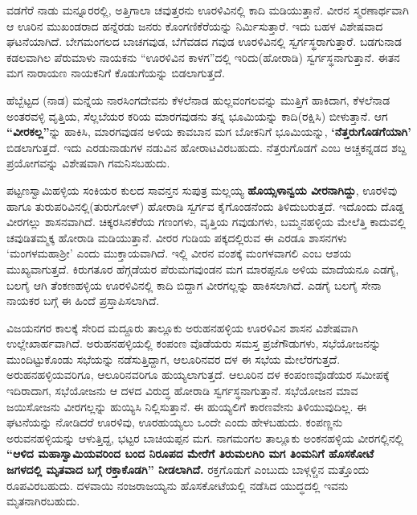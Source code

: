 ವಡಗೆರೆ ನಾಡು ಮನ್ನೂರರಲ್ಲಿ, ಅತ್ತಿಗಾಲಾ ಚವುತ್ತರನು ಊರಳಿವಿನಲ್ಲಿ ಕಾದಿ ಮಡಿಯುತ್ತಾನೆ. ವೀರನ ಸ್ಮರಣಾರ್ಥವಾಗಿ ಆ ಊರಿನ ಮುಖಂಡರಾದ ಹನ್ನೆರಡು ಜನರು ಕೊಂಗಣಿಕೆರೆಯನ್ನು ನಿರ್ಮಿಸುತ್ತಾರೆ. ಇದು ಬಹಳ ವಿಶೇಷವಾದ ಘಟನೆಯಾಗಿದೆ. ಬೇಗಮಂಗಲದ ಬಾಚಗವುಡ, ಬೆಗೆವಡದ ಗವುಡ ಊರಳಿವಿನಲ್ಲಿ ಸ್ವರ್ಗಸ್ಥರಾಗುತ್ತಾರೆ. ಬಡಗುನಾಡ ಕಡಲವಾಗಿಲ ಪೆರುಮಾಳು ನಾಯಕನು “ಊರಳಿವಿನ ಕಾಳಗ”ದಲ್ಲಿ ಇರಿದು(ಹೋರಾಡಿ) ಸ್ವರ್ಗಸ್ಥನಾಗುತ್ತಾನೆ. ಈತನ ಮಗ ನಾರಾಯಣ ನಾಯಕನಿಗೆ ಕೊಡುಗೆಯನ್ನು ಬಿಡಲಾಗುತ್ತದೆ.

ಹೆಬ್ಬೆಟ್ಟದ (ನಾಡ) ಮನ್ನೆಯ ನಾರಸಿಂಗದೇವನು ಕೆಳಲೆನಾಡ ಹುಲ್ಲವಂಗಲವನ್ನು ಮುತ್ತಿಗೆ ಹಾಕಿದಾಗ, ಕೆಳಲೆನಾಡ ಅಂತರವಳ್ಳಿ ವೃತ್ತಿಯ, ಸೆಲ್ಲಬೆಯರ ಕರಿಯ ಮಾರಗವುಡನು ತನ್ನ ಭೂಮಿಯನ್ನು ಕಾದಿ(ರಕ್ಷಿಸಿ) ಬೀಳುತ್ತಾನೆ. ಆಗ \textbf{“ವೀರಕಲ್ಲ”}ನ್ನು ಹಾಕಿಸಿ, ಮಾರಗವುಡನ ಅಳಿಯ ಕಾವಬಾನ ಮಗ ಬೋಕನಿಗೆ ಭೂಮಿಯನ್ನು, \textbf{‘ನೆತ್ತರುಗೊಡಗೆಯಾಗಿ’} ಬಿಡಲಾಗುತ್ತದೆ. ಇದು ಎರಡುನಾಡುಗಳ ನಡುವಿನ ಹೋರಾಟವಿರಬಹುದು. ನೆತ್ತರುಗೊಡಗೆ ಎಂಬ ಅಚ್ಚಕನ್ನಡದ ಶಬ್ದ ಪ್ರಯೋಗವನ್ನು ವಿಶೇಷವಾಗಿ ಗಮನಿಸಬಹುದು.

\newpage

ಪಟ್ಟಣಸ್ವಾಮಿಹಳ್ಳಿಯ ಸಂಕಿಯರ ಕುಲದ ಸಾವನ್ತನ ಸುಪುತ್ರ ಮಲ್ಲಯ್ಯ \textbf{ಹೊಯ್ಸಳಾನ್ವಯ ವೀರನಾಗಿದ್ದು}, ಊರಳಿವು ಹಾಗೂ ತುರುಪರಿವಿನಲ್ಲಿ(ತುರುಗೋಳ್​) ಹೋರಾಡಿ ಸ್ವರ್ಗವ ಕೈಗೊಂಡನೆಂದು ತಿಳಿದುಬರುತ್ತದೆ. ಇದೊಂದು ದೊಡ್ಡ ವೀರಗಲ್ಲು ಶಾಸನವಾಗಿದೆ. ಚಿಕ್ಕರಸಿನಕೆರೆಯ ಗಣಂಗಳು, ವೃತ್ತಿಯ ಗವುಡುಗಳು, ಬಮ್ಮನಹಳ್ಳಿಯ ಮೇಲೆತ್ತಿ ಕಾದುವಲ್ಲಿ ಚವುಡಿತಮ್ಮಕ್ಕ ಹೋರಾಡಿ ಮಡಿಯುತ್ತಾನೆ. ವೀರರ ಗುಡಿಯ ಪಕ್ಕದಲ್ಲಿರುವ ಈ ಎರಡೂ ಶಾಸನಗಳು ‘ಮಂಗಳಮಹಾಶ‍್ರೀ’ ಎಂದು ಮುಕ್ತಾಯವಾಗಿದೆ. ಇಲ್ಲಿ ವೀರನ ವಂಶಕ್ಕೆ ಮಂಗಳವಾಗಲಿ ಎಂಬ ಆಶಯ ಮುಖ್ಯವಾಗುತ್ತದೆ. ಕಿರುಗತೂರ ಹೆಗ್ಗಡೆಯರ ಪೆರುಮಗವುಂಡನ ಮಗ ಮಾರಪ್ಪನೂ ಅಳಿಯ ಮಾದೆಯನೂ ಎಡಗೈ, ಬಲಗೈ ಆಗಿ ತೆಂಕಣಹಳ್ಳಿಯ ಊರಳಿವಿನಲ್ಲಿ ಕಾದಿ ಬಿದ್ದಾಗ ವೀರಗಲ್ಲನ್ನು ಹಾಕಿಸಲಾಗಿದೆ. ಎಡಗೈ ಬಲಗೈ ಸೇನಾ ನಾಯಕರ ಬಗ್ಗೆ ಈ ಹಿಂದೆ ಪ್ರಸ್ತಾಪಿಸಲಾಗಿದೆ.

\vskip -2pt

ವಿಜಯನಗರ ಕಾಲಕ್ಕೆ ಸೇರಿದ ಮದ್ದೂರು ತಾಲ್ಲೂಕು ಅರುಹನಹಳ್ಳಿಯ ಊರಳಿವಿನ ಶಾಸನ ವಿಶೇಷವಾಗಿ ಉಲ್ಲೇಖಾರ್ಹವಾಗಿದೆ. ಅರುಹನಹಳ್ಳಿಯಲ್ಲಿ ಕಂಪಂಣ ವೊಡೆಯರು ಸಮಸ್ತ ಪ್ರಜೆಗೌಡುಗಳು, ಸಭೆಯೋಜನನ್ನು ಮುಂದಿಟ್ಟು\-ಕೊಂಡು ಸಭೆಯನ್ನು ನಡೆಸುತ್ತಿದ್ದಾಗ, ಆಲೂರಿನವರ ದಳ ಈ ಸಭೆಯ ಮೇಲೆರಗುತ್ತದೆ. ಅರುಹನಹಳ್ಳಿಯವರಿಗೂ, ಆಲೂರಿನವರಿಗೂ ಹುಯ್ಯಲಾಗುತ್ತದೆ. ಆಲೂರಿನ ದಳ ಕಂಪಂಣವೊಡೆಯರ ಸಮೀಪಕ್ಕೆ ಇದಿರಾದಾಗ, ಸಭೆಯೋಜನು ಆ ದಳದ ವಿರುದ್ಧ ಹೋರಾಡಿ ಸ್ವರ್ಗಸ್ಥನಾಗುತ್ತಾನೆ. ಸಭೆಯೋಜನ ಮಾವ ಜಯಿಸೋಜನು ವೀರಗಲ್ಲನ್ನು ಹುಯ್ಯಿಸಿ ನಿಲ್ಲಿಸುತ್ತಾನೆ. ಈ ಹುಯ್ಯಲಿಗೆ ಕಾರಣವೇನು ತಿಳಿಯುವುದಿಲ್ಲ. ಈ ಘಟನೆಯನ್ನು ನೋಡಿದರೆ ಊರಳಿವು, ಊರಹುಯ್ಯಲು ಒಂದೇ ಎಂದು ಹೇಳಬಹುದು. ಕಂಪಣ್ಣನು ಅರುವನಹಳ್ಳಿಯನ್ನು ಆಳುತ್ತಿದ್ದ, ಭಟ್ಟರ ಬಾಚಿಯಪ್ಪನ ಮಗ. ನಾಗಮಂಗಲ ತಾಲ್ಲೂಕು ಅಂಕನಹಳ್ಳಿಯ ವೀರಗಲ್ಲಿನಲ್ಲಿ \textbf{“ಆಳಿದ ಮಹಾಸ್ವಾಮಿಯವರಿಂದ ಬಂದ ನಿರೂಪದ ಮೇರೆಗೆ ತಿರುಮಲಗಿರಿ ಮಗ ತಿಂಮನಿಗೆ ಹೊಸಕೋಟೆ ಜಗಳದಲ್ಲಿ ಮೃತವಾದ ಬಗ್ಗೆ ರಕ್ತಾಕೊಡಗಿ” ನೀಡಲಾಗಿದೆ.} ರಕ್ತಗೊಡುಗೆ ಎಂಬುದು ಬಾಳ್ಗಳ್ಚಿನ ಮತ್ತೊಂದು ರೂಪವಿರಬಹುದು. ದಳವಾಯಿ ನಂಜರಾಜಯ್ಯನು ಹೊಸಕೋಟೆಯಲ್ಲಿ ನಡೆಸಿದ ಯುದ್ಧದಲ್ಲಿ ಇವನು ಮೃತನಾಗಿರಬಹುದು.\\[-.7cm]


